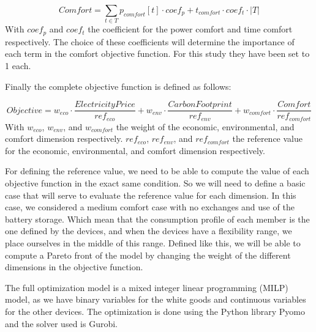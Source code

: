 \begin{equation}
    Comfort = \sum_{t \in T} p_{comfort}[t] \cdot coef_p + t_{comfort} \cdot coef_t \cdot |T|
\end{equation}
With $coef_p$ and $coef_t$ the coefficient for the power comfort and time comfort respectively. The choice of these coefficients will determine the importance of each term in the comfort objective function. For this study they have been set to 1 each.

Finally the complete objective function is defined as follows:

\begin{equation}
    Objective = w_{eco} \cdot \frac{ElectricityPrice}{ref_{eco}} + w_{env} \cdot \frac{CarbonFootprint}{ref_{env}} + w_{comfort} \cdot \frac{Comfort}{ref_{comfort}}
\end{equation}
With $w_{eco}$, $w_{env}$, and $w_{comfort}$ the weight of the economic, environmental, and comfort dimension respectively. $ref_{eco}$, $ref_{env}$, and $ref_{comfort}$ the reference value for the economic, environmental, and comfort dimension respectively.

For defining the reference value, we need to be able to compute the value of each objective function in the exact same condition. So we will need to define a basic case that will serve to evaluate the reference value for each dimension. In this case, we considered a medium comfort case with no exchanges and use of the battery storage. Which mean that the consumption profile of each member is the one defined by the devices, and when the devices have a flexibility range, we place ourselves in the middle of this range. Defined like this, we will be able to compute a Pareto front of the model by changing the weight of the different dimensions in the objective function. 

The full optimization model is a mixed integer linear programming (MILP) model, as we have binary variables for the white goods and continuous variables for the other devices. The optimization is done using the Python library Pyomo and the solver used is Gurobi.